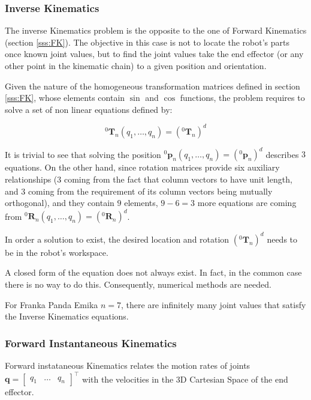\subsubsection{Inverse Kinematics}
\label{sss:IK}

The inverse Kinematics problem is the opposite to the one of Forward Kinematics (section \ref{sss:FK}). The objective in this case is not to locate the robot's parts once known joint values, but to find the joint values take the end effector (or any other point in the kinematic chain) to a given position and orientation.

Given the nature of the homogeneous transformation matrices defined in section \ref{sss:FK}, whose elements contain $\sin$ and $\cos$ functions, the problem requires to solve a set of non linear equations defined by:

$$
^{0}\mathbf{T}_{n}(q_{1}, \dots, q_{n}) = (^{0}\mathbf{T}_{n})^{d}
$$

It is trivial to see that solving the position $^{0} \boldsymbol{p}_{n}(q_{1}, \dots, q_{n}) = (^{0} \boldsymbol{p}_{n})^{d}$ describes $3$ equations. On the other hand, since rotation matrices provide six auxiliary relationships ($3$ coming from the fact that column vectors to have unit length, and $3$ coming from the requirement of its column vectors being mutually orthogonal), and they contain $9$ elements, $9 - 6 = 3$ more equations are coming from $^{0} \mathbf{R}_{n}(q_{1}, \dots, q_{n}) = (^{0} \mathbf{R}_{n})^{d}$.

In order a solution to exist, the desired location and rotation $(^{0}\mathbf{T}_{n})^{d}$ needs to be in the robot's workspace.

A closed form of the equation does not always exist. In fact, in the common case there is no way to do this. Consequently, numerical methods are needed.

For Franka Panda Emika $n = 7$, there are infinitely many joint values that satisfy the Inverse Kinematics equations.

\subsubsection{Forward Instantaneous Kinematics}

\label{sss:FIK}

Forward instataneous Kinematics relates the motion rates of joints $\mathbf{q} = \begin{bmatrix}q_{1} & \dots & q_{n}\end{bmatrix}^{\intercal}$ with the velocities in the 3D Cartesian Space of the end effector.

